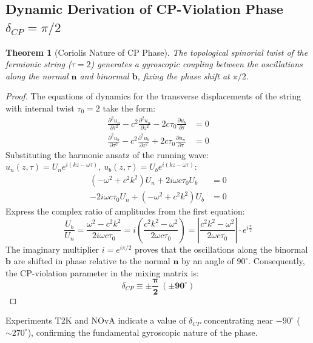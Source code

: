 \documentclass[12pt,a4paper]{article}
\newtheorem{theorem}{Theorem}
\begin{document}
		\subsection{Dynamic Derivation of CP-Violation Phase $\delta_{CP} = \pi/2$}
		\begin{theorem}[Coriolis Nature of CP Phase]
			The topological spinorial twist of the fermionic string ($\tau = 2$) generates a gyroscopic coupling between the oscillations along the normal $\mathbf{n}$ and binormal $\mathbf{b}$, fixing the phase shift at $\pi/2$.
		\end{theorem}
		
		\begin{proof}
			The equations of dynamics for the transverse displacements of the string with internal twist $\tau_0 = 2$ take the form:
			\begin{align}
				\frac{\partial^2 u_n}{\partial \tau^2} - c^2 \frac{\partial^2 u_n}{\partial z^2} - 2 c \tau_0 \frac{\partial u_b}{\partial \tau} &= 0 \\
				\frac{\partial^2 u_b}{\partial \tau^2} - c^2 \frac{\partial^2 u_b}{\partial z^2} + 2 c \tau_0 \frac{\partial u_n}{\partial \tau} &= 0
			\end{align}
			Substituting the harmonic ansatz of the running wave:\\ $u_n(z,\tau) = U_n e^{i(k z - \omega \tau)}, \ u_b(z,\tau) = U_b e^{i(k z - \omega \tau)}$:
			\begin{align}
				(-\omega^2 + c^2 k^2) U_n + 2 i \omega c \tau_0 U_b &= 0 \\
				-2 i \omega c \tau_0 U_n + (-\omega^2 + c^2 k^2) U_b &= 0
			\end{align}
			Express the complex ratio of amplitudes from the first equation:
			\begin{equation}
				\frac{U_b}{U_n} = \frac{\omega^2 - c^2 k^2}{2 i \omega c \tau_0} = i \left( \frac{c^2 k^2 - \omega^2}{2 \omega c \tau_0} \right) = \left| \frac{c^2 k^2 - \omega^2}{2 \omega c \tau_0} \right| \cdot e^{i \frac{\pi}{2}}
			\end{equation}
			The imaginary multiplier $i = e^{i\pi/2}$ proves that the oscillations along the binormal $\mathbf{b}$ are shifted in phase relative to the normal $\mathbf{n}$ by an angle of $90^{\circ}$. 
			Consequently, the CP-violation parameter in the mixing matrix is:
			\begin{equation}
				\delta_{CP} \equiv \mathbf{\pm \frac{\pi}{2} \ (\pm 90^{\circ})}
			\end{equation}
		\end{proof}
		Experiments T2K and NOvA indicate a value of $\delta_{CP}$ concentrating near $-90^{\circ}$ ($\sim 270^{\circ}$), confirming the fundamental gyroscopic nature of the phase.
		
\end{document}
